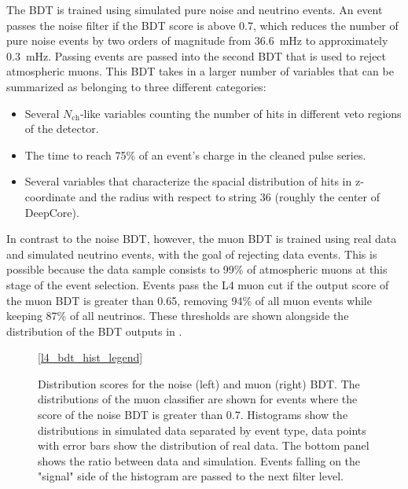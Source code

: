 The BDT is trained using simulated pure noise and neutrino events.
An event passes the noise filter if the BDT score is above 0.7, which reduces the number of pure noise events by two orders of magnitude from 36.6~mHz to approximately 0.3~mHz.
Passing events are passed into the second BDT that is used to reject atmospheric muons.
This BDT takes in a larger number of variables that can be summarized as belonging to three different categories:
\begin{itemize}
    \item Several $N_\mathrm{ch}$-like variables counting the number of hits in different veto regions of the detector.
    \item The time to reach 75\% of an event's charge in the cleaned pulse series.
    \item Several variables that characterize the spacial distribution of hits in z-coordinate and the radius with respect to string 36 (roughly the center of DeepCore).
\end{itemize}
In contrast to the noise BDT, however, the muon BDT is trained using real data and simulated neutrino events, with the goal of rejecting data events.
This is possible because the data sample consists to 99\% of atmospheric muons at this stage of the event selection.
Events pass the L4 muon cut if the output score of the muon BDT is greater than 0.65, removing 94\% of all muon events while keeping 87\% of all neutrinos.
These thresholds are shown alongside the distribution of the BDT outputs in .
\begin{figure}
    \centering
    \ref{l4_bdt_hist_legend}\hfill
    
    

    \caption{Distribution scores for the noise (left) and muon (right) BDT. The distributions of the muon classifier are shown for events where the score of the noise BDT is greater than 0.7. Histograms show the distributions in simulated data separated by event type, data points with error bars show the distribution of real data. The bottom panel shows the ratio between data and simulation. Events falling on the "signal" side of the histogram are passed to the next filter level.}
    \label{fig:l4-bdt-output}
\end{figure}

